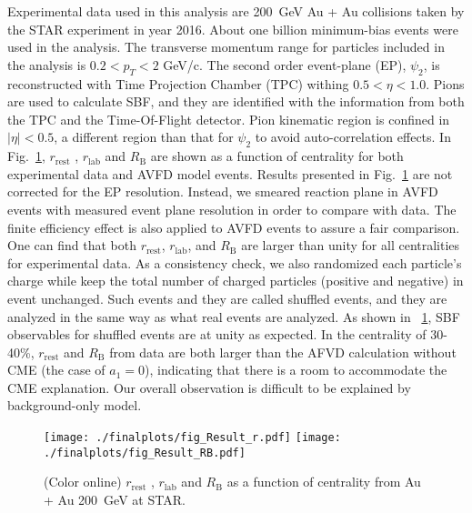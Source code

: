 Experimental data used in this analysis are 200~GeV Au + Au collisions taken by the STAR  experiment in year 2016. About one billion minimum-bias events were used in the analysis.
The transverse momentum range for particles included in the analysis is $0.2 < p_T < 2 $ GeV/c. The second order event-plane  (EP), $\psi _{2}$, is reconstructed with Time Projection Chamber (TPC) withing $ 0.5< \eta <1.0$. Pions are used to calculate SBF, and they are identified with the information from both the TPC and the Time-Of-Flight detector. Pion kinematic region is confined in $|\eta| <0.5$, a different region than that for $\psi _{2}$ to avoid auto-correlation effects. In Fig.~\ref{fig:finalresults}, $r_{\mathrm{rest}}$ , $r_{\mathrm{lab}}$  and  $R_{\mathrm{B}}$ are shown as a function of centrality for both experimental data and AVFD model events. Results presented in Fig.~\ref{fig:finalresults}  are not corrected for the EP resolution. Instead, we smeared reaction plane in AVFD events with measured  event plane resolution in order to compare with data. The finite efficiency effect is also applied to AVFD events to assure a fair comparison.  One can find that both $r_{\mathrm{rest}}$, $r_{\mathrm{lab}}$, and $R_{\mathrm{B}}$ are larger than unity for all centralities for experimental data. As a consistency check, we also randomized each particle's charge while keep the total number of charged particles (positive and negative) in event unchanged. Such events and they are called shuffled events, and they are analyzed in the same way as what real events are analyzed. As shown in ~\ref{fig:finalresults}, SBF observables for shuffled events are at unity as expected. In the centrality of  30-40\%,  $r_{\mathrm{rest}}$ and $R_{\mathrm{B}}$ from data are both larger than the AFVD calculation without CME (the case of $a_1 =0$), indicating that there is a room to accommodate the CME explanation. Our overall observation is difficult to be explained by background-only model.


\begin{figure}[htbp!]
	\centering
	\texttt{[image: ./finalplots/fig\_Result\_r.pdf]}
	\texttt{[image: ./finalplots/fig\_Result\_RB.pdf]}
	\vspace{-0.7cm}
	\caption{(Color online) 
	$r_{\mathrm{rest}}$ , $r_{\mathrm{lab}}$  and  $R_{\mathrm{B}}$ as a function of centrality from Au + Au 200~GeV at STAR.
	}
	\label{fig:finalresults}
\end{figure}


